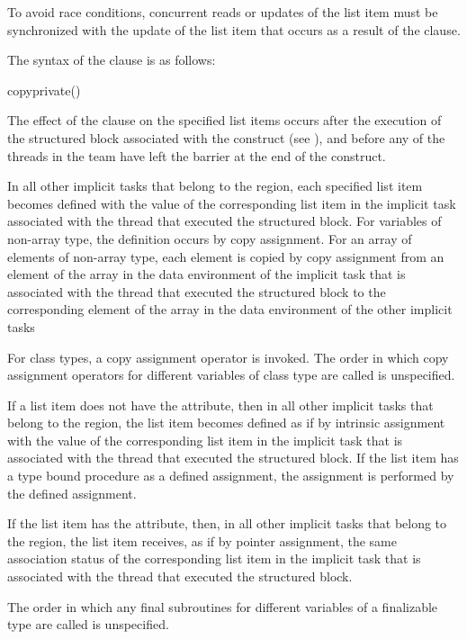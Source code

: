 To avoid race conditions, concurrent reads or updates of the list item must be
synchronized with the update of the list item that occurs as a result of the
 clause.

\syntax
The syntax of the  clause is as follows:

\begin{ompSyntax}
copyprivate()
\end{ompSyntax}

\descr
The effect of the  clause on the specified list items occurs 
after the execution of the structured block associated with the  
construct (see ), and before any of the threads 
in the team have left the barrier at the end of the construct.

\begin{ccppspecific}
In all other implicit tasks that belong to the  region, each 
specified list item becomes defined with the value of the corresponding list 
item in the implicit task associated with the thread that executed the 
structured block. For variables of non-array type, the definition occurs by 
copy assignment. For an array of elements of non-array type, each element is
copied by copy assignment from an element of the array in the data environment of the
implicit task that is associated with the thread that executed the structured 
block to the corresponding element of the array in the data environment of the 
other implicit tasks
\end{ccppspecific}

\begin{cppspecific}
For class types, a copy assignment operator is invoked. The order in which copy
assignment operators for different variables of class type are called is unspecified.
\end{cppspecific}

\begin{fortranspecific}
If a list item does not have the  attribute, then in all other 
implicit tasks that belong to the  region, the list item becomes 
defined as if by intrinsic assignment with the value of the corresponding list 
item in the implicit task that is associated with the thread that executed the 
structured block.  If the list item has a type bound procedure as a defined 
assignment, the assignment is performed by the defined assignment.

If the list item has the  attribute, then, in all other implicit 
tasks that belong to the  region, the list item receives, as if by 
pointer assignment, the same association status of the corresponding list item in the 
implicit task that is associated with the thread that executed the structured block.

The order in which any final subroutines for different variables of a finalizable 
type are called is unspecified.
\end{fortranspecific}

